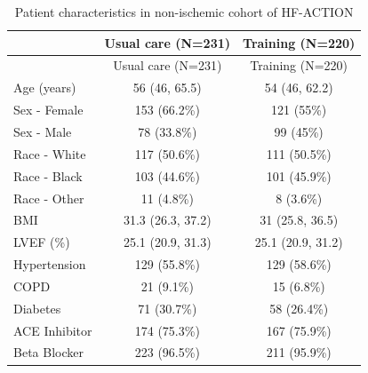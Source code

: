 \documentclass[
  letterpaper,
  DIV=11,
  numbers=noendperiod]{scrreprt}
\begin{document}
\hypertarget{tbl-hfaction-reg-tabone}{}
\begin{longtable}[]{@{}lcc@{}}
\caption{\label{tbl-hfaction-reg-tabone}Patient characteristics in
non-ischemic cohort of HF-ACTION}\tabularnewline
\toprule\noalign{}
& Usual care (N=231) & Training (N=220) \\
\midrule\noalign{}
\endfirsthead
\toprule\noalign{}
& Usual care (N=231) & Training (N=220) \\
\midrule\noalign{}
\endhead
\bottomrule\noalign{}
\endlastfoot
Age (years) & 56 (46, 65.5) & 54 (46, 62.2) \\
Sex - Female & 153 (66.2\%) & 121 (55\%) \\
Sex - Male & 78 (33.8\%) & 99 (45\%) \\
Race - White & 117 (50.6\%) & 111 (50.5\%) \\
Race - Black & 103 (44.6\%) & 101 (45.9\%) \\
Race - Other & 11 (4.8\%) & 8 (3.6\%) \\
BMI & 31.3 (26.3, 37.2) & 31 (25.8, 36.5) \\
LVEF (\%) & 25.1 (20.9, 31.3) & 25.1 (20.9, 31.2) \\
Hypertension & 129 (55.8\%) & 129 (58.6\%) \\
COPD & 21 (9.1\%) & 15 (6.8\%) \\
Diabetes & 71 (30.7\%) & 58 (26.4\%) \\
ACE Inhibitor & 174 (75.3\%) & 167 (75.9\%) \\
Beta Blocker & 223 (96.5\%) & 211 (95.9\%) \\
\end{longtable}
\end{document}
